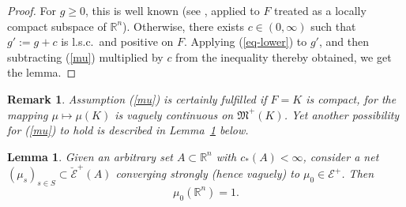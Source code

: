 \documentclass[12pt,a4paper,reqno]{amsart} %
\theoremstyle{lause}
\theoremstyle{maaritelma}
\theoremstyle{lause}
\newtheorem{lemma}[theorem]{Lemma}
\theoremstyle{maaritelma}
\newtheorem{remark}[theorem]{Remark}
\numberwithin{equation}{section}
\begin{document}
\begin{proof}
For $g\geqslant0$, this is well known (see \cite[Section~IV.1, Proposition~4]{B2}, applied to $F$ treated as a locally compact subspace of $\mathbb R^n$). Otherwise, there exists $c\in(0,\infty)$ such that $g':=g+c$ is l.s.c.\ and positive on $F$. Applying (\ref{eq-lower}) to $g'$, and then subtracting (\ref{mu}) multiplied by $c$
from the inequality thereby obtained, we get the lemma.\end{proof}

\begin{remark}
 Assumption (\ref{mu}) is certainly fulfilled if $F=K$ is compact, for the mapping $\mu\mapsto\mu(K)$ is vaguely continuous on $\mathfrak M^+(K)$. Yet another possibility for (\ref{mu}) to hold is described in Lemma~\ref{str-cl-1} below.
\end{remark}

\begin{lemma}\label{str-cl-1}
Given an arbitrary set $A\subset\mathbb R^n$ with $c_*(A)<\infty$, consider a net $(\mu_s)_{s\in S}\subset\breve{\mathcal E}^+(A)$ converging strongly {\rm(}hence vaguely{\rm)} to $\mu_0\in\mathcal E^+$. Then
\begin{equation}\label{exm}\mu_0(\mathbb R^n)=1.\end{equation}
\end{lemma}
\end{document}
